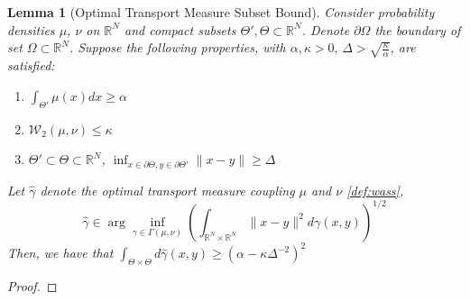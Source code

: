 \documentclass[journal,onecolumn]{IEEEtran}
\newtheorem{lemma}{Lemma}
\newcommand{\reals}{\mathbb{R}}
\newcommand{\dimn}{N}
\newcommand{\wass}{\mathcal{W}_2}
\newcommand{\del}{\partial}
\begin{document}
{{\color{black}
\begin{lemma}[Optimal Transport Measure Subset Bound]
\label{lem:otsubset}
Consider probability densities $\mu$, $\nu$ on $\reals^{\dimn}$ and compact subsets $\Theta',\Theta \subset \reals^{\dimn}$. Denote $\del\Omega$ the boundary of set $\Omega \subset \reals^{\dimn}$. Suppose the following properties, with $\alpha,\kappa > 0, \,\Delta > \sqrt{\frac{\kappa}{\alpha}}$, are satisfied:
\begin{enumerate}[label=\roman*)]
    \item $\int_{\Theta'} \mu(x)dx \geq \alpha$
    \item $\wass(\mu,\nu) \leq \kappa$
    \item $\Theta' \subset \Theta \subset \reals^{\dimn}$,  $\inf_{x\in\del\Theta,y\in\del\Theta'}\|x-y\| \geq \Delta$
\end{enumerate}
Let $\hat{\gamma}$ denote the optimal transport measure coupling $\mu$ and $\nu$ \eqref{def:wass},
\[\hat{\gamma} \in \arg\inf_{\gamma\in\Gamma(\mu,\nu)}\left(\int_{\reals^{\dimn}\times\reals^{\dimn}}\|x-y\|^2d\gamma(x,y)\right)^{1/2}\]
Then, we have that $\int_{\Theta\times\Theta}d\hat{\gamma}(x,y) \geq (\alpha - \kappa\Delta^{-2})^2$
\end{lemma}

\begin{proof}


\end{proof}}}
\end{document}
